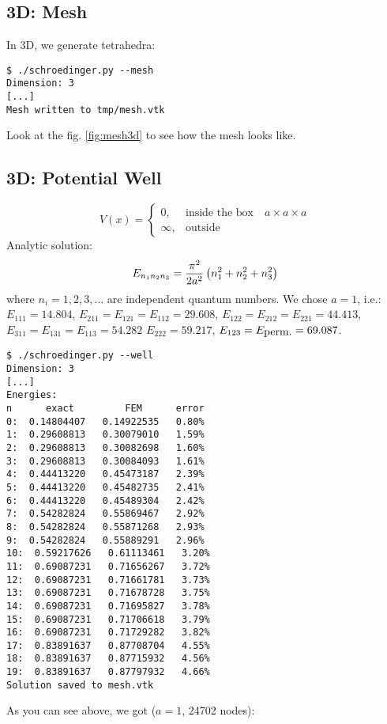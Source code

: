 \subsection{3D: Mesh}

In 3D, we generate tetrahedra:

\begin{lstlisting}
$ ./schroedinger.py --mesh
Dimension: 3
[...]
Mesh written to tmp/mesh.vtk
\end{lstlisting}

Look at the fig. \ref{fig:mesh3d} to see how the mesh looks like.


\subsection{3D: Potential Well}

$$V(x)=\begin{cases}0,&\text{inside the box}\quad a\times a\times a \\
\infty, & \text{outside}\end{cases}$$
Analytic solution:
$$E_{n_1n_2n_3}={\pi^2\over2a^2}\left(n_1^2 + n_2^2 + n_3^2\right)$$
where $n_i = 1, 2, 3, \dots$ are independent quantum numbers.
We chose $a=1$, i.e.: $E_{111}=14.804$, $E_{211}=E_{121}=E_{112}=29.608$,
$E_{122}=E_{212}=E_{221}=44.413$,
$E_{311}=E_{131}=E_{113}=54.282$
$E_{222}=59.217$, $E_{123}=E_{\hbox{perm.}}=69.087$.

\begin{lstlisting}
$ ./schroedinger.py --well
Dimension: 3
[...]
Energies:
n      exact         FEM      error
0:  0.14804407   0.14922535   0.80%
1:  0.29608813   0.30079010   1.59%
2:  0.29608813   0.30082698   1.60%
3:  0.29608813   0.30084093   1.61%
4:  0.44413220   0.45473187   2.39%
5:  0.44413220   0.45482735   2.41%
6:  0.44413220   0.45489304   2.42%
7:  0.54282824   0.55869467   2.92%
8:  0.54282824   0.55871268   2.93%
9:  0.54282824   0.55889291   2.96%
10:  0.59217626   0.61113461   3.20%
11:  0.69087231   0.71656267   3.72%
12:  0.69087231   0.71661781   3.73%
13:  0.69087231   0.71678728   3.75%
14:  0.69087231   0.71695827   3.78%
15:  0.69087231   0.71706618   3.79%
16:  0.69087231   0.71729282   3.82%
17:  0.83891637   0.87708704   4.55%
18:  0.83891637   0.87715932   4.56%
19:  0.83891637   0.87797932   4.66%
Solution saved to mesh.vtk
\end{lstlisting}

As you can see above, we got ($a=1$, 24702 nodes):

